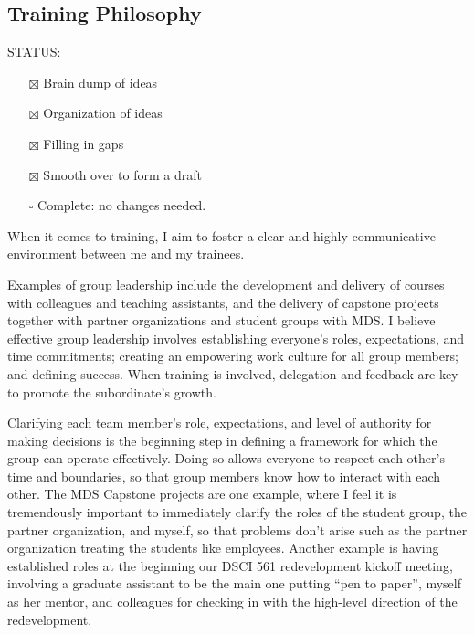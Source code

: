 \documentclass[]{article}
\providecommand{\tightlist}{%
  \setlength{\itemsep}{0pt}\setlength{\parskip}{0pt}}
\begin{document}
\hypertarget{training-philosophy}{%
\subsection{Training Philosophy}\label{training-philosophy}}

STATUS:

\begin{itemize}
\tightlist
\item[$\boxtimes$]
  Brain dump of ideas
\item[$\boxtimes$]
  Organization of ideas
\item[$\boxtimes$]
  Filling in gaps
\item[$\boxtimes$]
  Smooth over to form a draft
\item[$\square$]
  Complete: no changes needed.
\end{itemize}

When it comes to training, I aim to foster a clear and highly communicative environment between me and my trainees.

Examples of group leadership include the development and delivery of courses with colleagues and teaching assistants, and the delivery of capstone projects together with partner organizations and student groups with MDS. I believe effective group leadership involves establishing everyone's roles, expectations, and time commitments; creating an empowering work culture for all group members; and defining success. When training is involved, delegation and feedback are key to promote the subordinate's growth.

Clarifying each team member's role, expectations, and level of authority for making decisions is the beginning step in defining a framework for which the group can operate effectively. Doing so allows everyone to respect each other's time and boundaries, so that group members know how to interact with each other. The MDS Capstone projects are one example, where I feel it is tremendously important to immediately clarify the roles of the student group, the partner organization, and myself, so that problems don't arise such as the partner organization treating the students like employees. Another example is having established roles at the beginning our DSCI 561 redevelopment kickoff meeting, involving a graduate assistant to be the main one putting ``pen to paper'', myself as her mentor, and colleagues for checking in with the high-level direction of the redevelopment.
\end{document}
